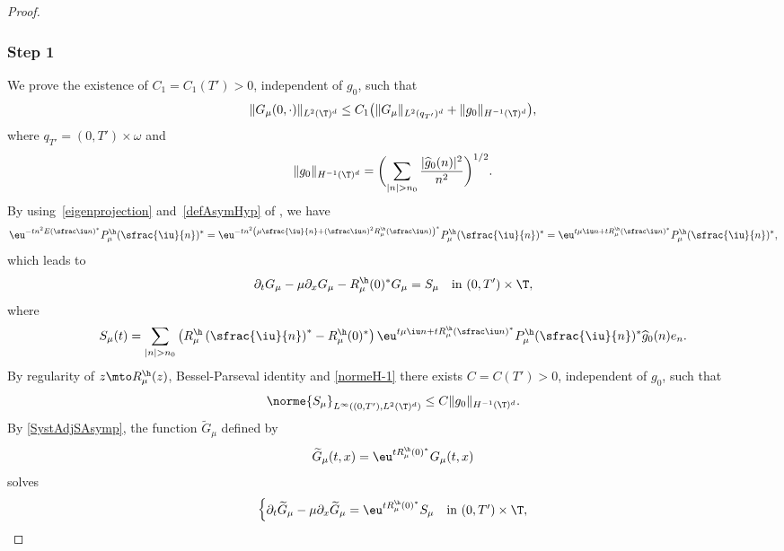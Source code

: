 \begin{proof}
\subsubsection*{Step 1}
We prove the existence of $C_1=C_1(T')>0$, independent of $g_0$, such that
\begin{equation}
\label{HF_Hyp_Step1}
\lVert{{G_\mu}(0,\cdot)}\rVert_{L^2(\T)^{d}} \leq C_1 \bigl(\|G_\mu\|_{L^2(q_{T'})^d} + \|g_0\|_{H^{-1}(\T)^d} \bigr),
\end{equation}
where $q_{T'} = (0,T')\times\omega$ and
\begin{equation} \label{normeH-1}
\|g_0\|_{H^{-1}(\T)^d} = \biggl(\sum_{|n| > n_0} \frac{|\widehat{g}_0(n)|^{2}}{n^2} \biggr)^{1/2}.
\end{equation}
By using~\eqref{eigenprojection} and~\eqref{defAsymHyp} of , we have
\[
\eu^{-t n^2 {E}\left(\sfrac \iu n\right)^*}{P_\mu^\h}(\sfrac{\iu}{n})^* = \eu^{-tn^2\left(\mu \sfrac{\iu}{n} + \left(\sfrac \iu n\right)^{2} R_\mu^\h\left(\sfrac \iu n\right)\right)^*} {P_\mu^\h}(\sfrac{\iu}{n})^* = \eu^{t \mu \iu n + t {R_\mu^\h}\left(\sfrac \iu n\right)^*}{P_\mu^\h}(\sfrac{\iu}{n})^*,
\]
which leads to
\begin{equation}
\label{SystAdjSAsymp}
\partial_t G_\mu - \mu \partial_x G_\mu - {R_\mu^{\h}}(0)^* G_\mu = S_\mu \quad \text{in}\ (0,T')\times\T,
\end{equation}
where
\begin{equation}\label{Smu}
S_\mu(t)=\sum_{|n|>n_0} \left(R_\mu^\h\left(\sfrac{\iu}{n} \right)^* - R_\mu^\h(0)^* \right) \eu^{t \mu \iu n + t {R_\mu^\h}\left(\sfrac \iu n\right)^*}{P_\mu^\h}(\sfrac{\iu}{n})^* \widehat{g}_0(n) e_n.
\end{equation}
By regularity of $z\mto R_\mu^\h(z)$, Bessel-Parseval identity and \eqref{normeH-1} there exists $C=C(T')>0$, independent of $g_0$, such that
\begin{equation}
\label{defsourcecomp}
\norme{S_\mu}_{L^\infty((0,T'),L^2(\T)^{d})} \leq C \| g_0\|_{H^{-1}(\T)^d}.
\end{equation}
By \eqref{SystAdjSAsymp}, the function $\widetilde{G}_\mu$ defined by
\begin{equation} \label{def:gmutilde}
\widetilde{G}_{\mu}(t,x) =\eu^{t R_{\mu}^{\h}(0)^*} G_{\mu}(t,x)
\end{equation}
solves
\begin{equation} \label{syst_gmutilde}
\begin{cases}
\partial_t \widetilde{G}_\mu - \mu \partial_x \widetilde{G}_\mu = \eu^{t R_{\mu}^{\h}(0)^*} S_\mu&\text{in}\ (0,T')\times\T,\\

\end{cases}
\end{equation}
\end{proof}
